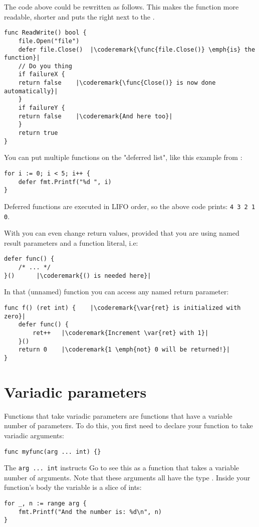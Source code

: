 The code above could be rewritten as follows. This makes the 
function more readable, shorter and puts the  right next 
to the .
\begin{lstlisting}[caption=With \func{defer}]
func ReadWrite() bool {
    file.Open("file")
    defer file.Close()	|\coderemark{\func{file.Close()} \emph{is} the function}|
    // Do you thing
    if failureX {
	return false    |\coderemark{\func{Close()} is now done automatically}|
    }
    if failureY {
	return false    |\coderemark{And here too}|
    }
    return true
}
\end{lstlisting}
You can put multiple functions on the "deferred list", like this
example from \cite{effective_go}:
\begin{lstlisting}
for i := 0; i < 5; i++ { 
    defer fmt.Printf("%d ", i) 
} 
\end{lstlisting}
Deferred functions are executed in LIFO order, so the above code
prints: \lstinline{4 3 2 1 0}. 


With  you can even change return values, provided that
you are using named result parameters and a function
literal, i.e:
\begin{lstlisting}[caption=Function literal]
defer func() {
	/* ... */
}()		 |\coderemark{() is needed here}|
\end{lstlisting}
In that (unnamed) function you can access any named return
parameter:
\begin{lstlisting}[caption=Access return values within \func{defer}]
func f() (ret int) {    |\coderemark{\var{ret} is initialized with zero}|
	defer func() {
		ret++	|\coderemark{Increment \var{ret} with 1}|
	}()
	return 0	|\coderemark{1 \emph{not} 0 will be returned!}|
}
\end{lstlisting}

\section{Variadic parameters}
Functions that take variadic parameters are functions that have a
variable number of parameters. To do this, you first
need to declare your function to take variadic arguments:
\begin{lstlisting}[caption=Variadac function declaration]
func myfunc(arg ... int) {}
\end{lstlisting}
The \lstinline{arg ... int} instructs Go to see this as a function that
takes a variable number of arguments. Note that these arguments all
have the type . Inside your function's body the variable
 is a slice of ints:
\begin{lstlisting}
for _, n := range arg {
    fmt.Printf("And the number is: %d\n", n)
}
\end{lstlisting}

